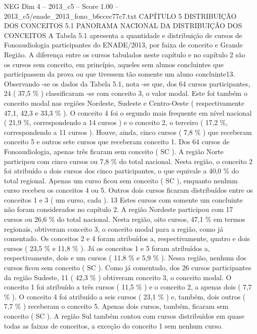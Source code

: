 \begin{textsample}{NEG Dim 4 – 2013\_c5 – Score 1.00 – 2013\_c5/enade\_2013\_fono\_b6ccec77c7.txt}  \label{ex:f4_neg_129}
CAPÍTULO 5 DISTRIBUIÇÃO DOS CONCEITOS 5.1 PANORAMA NACIONAL DA DISTRIBUIÇÃO DOS CONCEITOS A Tabela 5.1 apresenta a quantidade e distribuição de cursos de Fonoaudiologia participantes do ENADE/2013, por faixa de conceito e Grande Região.
A diferença entre os cursos tabulados neste capítulo e no capítulo 2 são os cursos sem conceito, em princípio, aqueles sem alunos concluintes que participassem da prova ou que tivessem tão somente um aluno concluinte13.
Observando -se os dados da Tabela 5.1, nota -se que, dos 64 cursos participantes, 24 ( 37,5 \% ) classificaram -se com conceito 3, o valor modal.
Este foi também o conceito modal nas regiões Nordeste, Sudeste e Centro-Oeste ( respectivamente 47,1, 42,3 e 33,3 \% ).
O conceito 4 foi o segundo mais frequente em nível nacional ( 21,9 \%, correspondendo a 14 cursos ) e o conceito 2, o terceiro ( 17,2 \%, correspondendo a 11 cursos ).
Houve, ainda, cinco cursos ( 7,8 \% ) que receberam conceito 5 e outros sete cursos que receberam conceito 1.
Dos 64 cursos de Fonoaudiologia, apenas três ficaram sem conceito ( SC ).
A região Norte participou com cinco cursos ou 7,8 \% do total nacional.
Nesta região, o conceito 2 foi atribuído a dois cursos dos cinco participantes, o que equivale a 40,0 \% do total regional.
Apenas um curso ficou sem conceito ( SC ), enquanto nenhum curso recebeu os conceitos 4 ou 5.
Outros dois cursos ficaram distribuídos entre os conceitos 1 e 3 ( um curso, cada ). 13 Estes cursos com somente um concluinte não foram considerados no capítulo 2.
A região Nordeste participou com 17 cursos ou 26,6 \% do total nacional.
Nesta região, oito cursos, 47,1 \% em termos regionais, obtiveram conceito 3, o conceito modal para a região, como já comentado.
Os conceitos 2 e 4 foram atribuídos a, respectivamente, quatro e dois cursos ( 23,5 \% e 11,8 \% ).
Já os conceitos 1 e 5 foram atribuídos a, respectivamente, dois e um cursos ( 11,8 \% e 5,9 \% ).
Nessa região, nenhum dos cursos ficou sem conceito ( SC ).
Como já comentado, dos 26 cursos participantes da região Sudeste, 11 ( 42,3 \% ) obtiveram conceito 3, o conceito modal.
O conceito 1 foi atribuído a três cursos ( 11,5 \% ) e o conceito 2, a apenas dois ( 7,7 \% ).
O conceito 4 foi atribuído a seis cursos ( 23,1 \% ) e, também, dois outros ( 7,7 \% ) receberam o conceito 5.
Apenas dois cursos, também, ficaram sem conceito ( SC ).
A região Sul também contou com cursos distribuídos em quase todas as faixas de conceitos, a exceção do conceito 1 sem nenhum curso.

\end{textsample}
